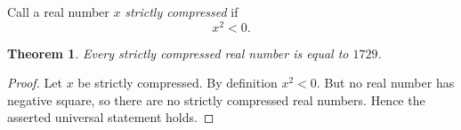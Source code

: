 \documentclass{article}
\newtheorem{theorem}{Theorem}
\begin{document}
Call a real number $x$ \emph{strictly compressed} if
\[
  x^2<0.
\]

\begin{theorem}\label{thm:empty-class}
Every strictly compressed real number is equal to $1729$.
\end{theorem}
\begin{proof}
Let $x$ be strictly compressed. By definition $x^2<0$. But no real number
has negative square, so there are no strictly compressed real numbers.
Hence the asserted universal statement holds.
\end{proof}
\end{document}
